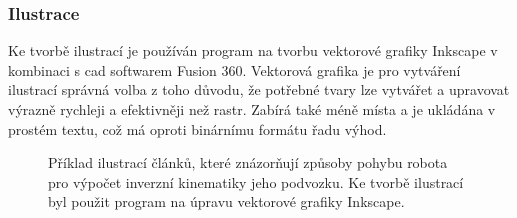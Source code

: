 \documentclass[a4paper, 12pt, twoside]{article}
\begin{document}
  \subsubsection{Ilustrace} \label{sec:Ilustrace}
  Ke tvorbě ilustrací je používán program na tvorbu vektorové grafiky Inkscape v kombinaci s \gls{cad} softwarem Fusion 360. Vektorová grafika je pro vytváření ilustrací správná volba z toho důvodu, že potřebné tvary lze vytvářet a upravovat výrazně rychleji a efektivněji než rastr. Zabírá také méně místa a je ukládána v prostém textu, což má oproti binárnímu formátu řadu výhod.

  \begin{figure}[H]
    \centering

    \hfill
    \hfill

    \caption[Příklad ilustrací článků]{Příklad ilustrací článků, které znázorňují způsoby pohybu robota pro výpočet inverzní kinematiky jeho podvozku. Ke tvorbě ilustrací byl použit program na úpravu vektorové grafiky Inkscape.}%
    \label{img:Příklad ilustrací článků}%
  \end{figure}
\end{document}
